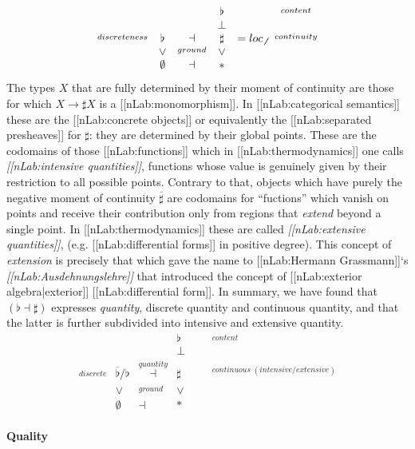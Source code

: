 \documentclass[12pt,titlepage]{article}
\newcommand{\itexarray}[1]{\begin{matrix}#1\end{matrix}}
\theoremstyle{plain}
\theoremstyle{definition}
\theoremstyle{remark}
\begin{document}
\begin{displaymath}
\itexarray{
     & && \flat && \stackrel{content}{}
     \\
     & && \bot &
     \\
     \stackrel{discreteness}{} & \flat &\dashv& \sharp & = loc_{\not \not}&  \stackrel{continuity}{}
     \\
     & \vee &\stackrel{ground}{}& \vee
     \\
     & \emptyset &\dashv& \ast &
  }
\end{displaymath}
The types $X$ that are fully determined by their moment of continuity are those for which $X \to \sharp X$ is a [[nLab:monomorphism]]. In [[nLab:categorical semantics]] these are the [[nLab:concrete objects]] or equivalently the [[nLab:separated presheaves]] for $\sharp$: they are determined by their global points. These are the codomains of those [[nLab:functions]] which in [[nLab:thermodynamics]] one calls \emph{[[nLab:intensive quantities]]}, functions whose value is genuinely given by their restriction to all possible points.
Contrary to that, objects which have purely the negative moment of continuity $\overline{\sharp}$ are codomains for ``fuctions'' which vanish on points and receive their contribution only from regions that \emph{extend} beyond a single point. In [[nLab:thermodynamics]] these are called \emph{[[nLab:extensive quantities]]}, (e.g. [[nLab:differential forms]] in positive degree). This concept of \emph{extension} is precisely that which gave the name to [[nLab:Hermann Grassmann]]`s \emph{[[nLab:Ausdehnungslehre]]} that introduced the concept of [[nLab:exterior algebra|exterior]] [[nLab:differential form]].
In summary, we have found that $(\flat \dashv \sharp)$ expresses \emph{quantity}, discrete quantity and continuous quantity, and that the latter is further subdivided into intensive and extensive quantity.
\begin{displaymath}
\itexarray{
     & && \flat & && \stackrel{content}{}
     \\
     & && \bot & &&
     \\
     \stackrel{discrete}{} & \overline{\flat}/\flat &\stackrel{quantity}{\dashv}& \sharp &  &   & \stackrel{continuous\; (intensive/extensive)}{}
     \\
     & \vee &\stackrel{ground}{}& \vee
     \\
     & \emptyset &\dashv& \ast &
  }
\end{displaymath}
\hypertarget{quality}{}\paragraph*{{Quality}}\label{quality}
\end{document}
